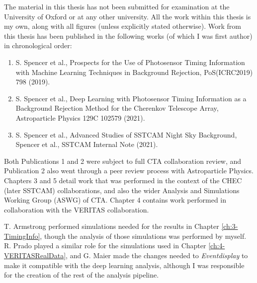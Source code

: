 The material in this thesis has not been submitted for examination at the University of Oxford or at any other university. All the work within this thesis is my own, along with all figures (unless explicitly stated otherwise). Work from this thesis has been published in the following works (of which I was first author) in chronological order:

\begin{centering}
\begin{enumerate}
    \item S. Spencer et al., Prospects for the Use of Photosensor Timing Information with Machine Learning Techniques in Background Rejection, PoS(ICRC2019) 798 (2019).
    \item S. Spencer et al., Deep Learning with Photosensor Timing Information as a Background Rejection Method for the Cherenkov Telescope Array, Astroparticle Physics 129C 102579 (2021).
    \item S. Spencer et al., Advanced Studies of SSTCAM Night Sky Background, Spencer et al., SSTCAM Internal Note (2021). 
\end{enumerate}
\end{centering}
Both Publications 1 and 2 were subject to full CTA collaboration review, and Publication 2 also went through a peer review process with Astroparticle Physics. Chapters 3 and 5 detail work that was performed in the context of the CHEC (later SSTCAM) collaborations, and also the wider Analysis and Simulations Working Group (ASWG) of CTA. Chapter 4 contains work performed in collaboration with the VERITAS collaboration.

T. Armstrong performed simulations needed for the results in Chapter \ref{ch:3-TimingInfo}, though the analysis of those simulations was performed by myself. R. Prado played a similar role for the simulations used in Chapter \ref{ch:4-VERITASRealData}, and G. Maier made the changes needed to \textit{Eventdisplay} to make it compatible with the deep learning analysis, although I was responsible for the creation of the rest of the analysis pipeline.